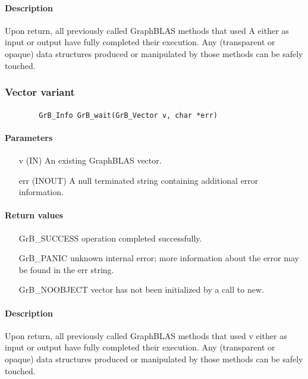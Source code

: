 {\paragraph{Description}

Upon return, all previously called GraphBLAS methods that used {\sf A} either as 
input or output have fully completed their execution.
Any (transparent or opaque) data structures produced or manipulated by those 
methods can be safely touched.


\subsubsection{Vector variant}

\paragraph{\syntax}

\begin{verbatim}
        GrB_Info GrB_wait(GrB_Vector v, char *err)
\end{verbatim}

\paragraph{Parameters}

\begin{itemize}[leftmargin=1.1in]
	    \item[{\sf v}]   ({\sf IN})     An existing GraphBLAS vector.
        \item[{\sf err}] ({\sf INOUT})  A null terminated string containing additional error
information.
\end{itemize}

\paragraph{Return values}
\begin{itemize}[leftmargin=2.1in]
\item[{\sf GrB\_SUCCESS}]	operation completed successfully.
\item[{\sf GrB\_PANIC}]		unknown internal error; more information about the error may be found in the {\sf err} string.
\item[{\sf GrB\_NOOBJECT}]  vector has not been initialized by a
                            call to {\sf new}.
\end{itemize}

\paragraph{Description}

Upon return, all previously called GraphBLAS methods that used {\sf v} either as
input or output have fully completed their execution.  Any (transparent or opaque)
data structures produced or manipulated by those methods can be safely touched.
}
